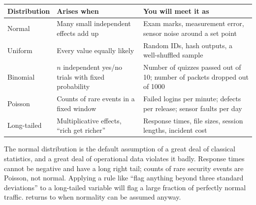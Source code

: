\begin{longtable}{@{}L{2.4cm}L{5.0cm}L{7.0cm}@{}}
\toprule
{}
\textbf{Distribution} & \textbf{Arises when} & \textbf{You will meet it as} \\
\midrule
\endhead
Normal & Many small independent effects add up & Exam marks, measurement error, sensor noise around a set point \\
Uniform & Every value equally likely & Random IDs, hash outputs, a well-shuffled sample \\
Binomial & $n$ independent yes/no trials with fixed probability & Number of quizzes passed out of 10; number of packets dropped out of 1000 \\
Poisson & Counts of rare events in a fixed window & Failed logins per minute; defects per release; sensor faults per day \\
Long-tailed & Multiplicative effects, ``rich get richer'' & Response times, file sizes, session lengths, incident cost \\
\bottomrule
\end{longtable}

\begin{alertbox}
The normal distribution is the default assumption of a great deal of classical
statistics, and a great deal of operational data violates it badly. Response times
cannot be negative and have a long right tail; counts of rare security events are
Poisson, not normal. Applying a rule like ``flag anything beyond three standard
deviations'' to a long-tailed variable will flag a large fraction of perfectly
normal traffic.  returns to when normality can be assumed
anyway.
\end{alertbox}

